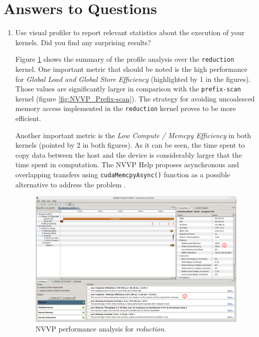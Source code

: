 \documentclass[a4paper,10pt]{scrartcl}
\begin{document}
\section{Answers to Questions}
\begin{enumerate}
 \item Use visual profiler to report relevant statistics about the execution of your kernels.  Did you find any surprising results?
 
 Figure \ref{fig:NVVP_Reduction} shows the summary of the profile analysis over the \texttt{reduction} kernel.  One important metric that should be noted is the high performance for \textit{Global Load and Global Store Efficiency} (highlighted by 1 in the figures).  Those values are significantly larger in comparison with the \texttt{prefix-scan} kernel (figure \ref{fig:NVVP_Prefix-scan}).  The strategy for avoiding uncoalesced memory access implemented in the \texttt{reduction} kernel proves to be more efficient.  
 
 Another important metric is the \textit{Low Compute / Memcpy Efficiency} in both kernels (pointed by 2 in both figures).  As it can be seen, the time spent to copy data between the host and the device is considerably larger that the time spent in computation. The NVVP Help proposes asynchronous and overlapping transfers using \texttt{cudaMemcpyAsync()} function as a possible alternative to address the problem \cite{overlap} \cite{fortran}.
 
 \begin{figure}
  \centering
  \includegraphics[width=\textwidth]{./NVVP_Reduction.png}
  \caption{NVVP performance analysis for \textit{reduction}.}\label{fig:NVVP_Reduction}
 \end{figure}


\end{enumerate}
\end{document}
